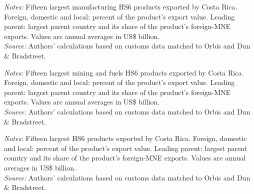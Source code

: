 \documentclass[11pt,a4paper]{article}
\begin{document}
\begin{table}[H]\centering\footnotesize%
  \caption{Costa Rica, Manufacturing: Fifteen Largest Export Products}%
  \label{tab:c_hs6_CRI_manufacturing}%
  \par\vspace{3pt}%
  \begin{minipage}{0.95\textwidth}\footnotesize %
  \textit{Notes:} Fifteen largest manufacturing HS6 products exported by Costa Rica. Foreign, domestic and local: percent of the product's export value. Leading parent: largest parent country and its share of the product's foreign-MNE exports. Values are annual averages in US\$ billion.\\[3pt]%
  \textit{Source:} Authors' calculations based on customs data matched to Orbis and Dun \& Bradstreet.%
  \end{minipage}%
  \end{table}
\begin{table}[H]\centering\footnotesize%
  \caption{Costa Rica, Mining and Fuels: Fifteen Largest Export Products}%
  \label{tab:c_hs6_CRI_mining}%
  \par\vspace{3pt}%
  \begin{minipage}{0.95\textwidth}\footnotesize %
  \textit{Notes:} Fifteen largest mining and fuels HS6 products exported by Costa Rica. Foreign, domestic and local: percent of the product's export value. Leading parent: largest parent country and its share of the product's foreign-MNE exports. Values are annual averages in US\$ billion.\\[3pt]%
  \textit{Source:} Authors' calculations based on customs data matched to Orbis and Dun \& Bradstreet.%
  \end{minipage}%
  \end{table}
\begin{table}[H]\centering\footnotesize%
  \caption{Costa Rica, Other Goods: Fifteen Largest Export Products}%
  \label{tab:c_hs6_CRI_rest}%
  \par\vspace{3pt}%
  \begin{minipage}{0.95\textwidth}\footnotesize %
  \textit{Notes:} Fifteen largest HS6 products exported by Costa Rica. Foreign, domestic and local: percent of the product's export value. Leading parent: largest parent country and its share of the product's foreign-MNE exports. Values are annual averages in US\$ billion.\\[3pt]%
  \textit{Source:} Authors' calculations based on customs data matched to Orbis and Dun \& Bradstreet.%
  \end{minipage}%
  \end{table}
\end{document}
